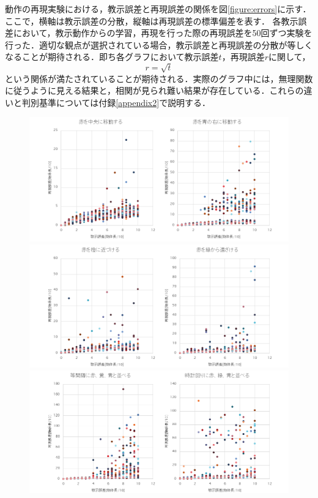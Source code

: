 動作の再現実験における，教示誤差と再現誤差の関係を図\ref{figure:errors}に示す．
ここで，横軸は教示誤差の分散，縦軸は再現誤差の標準偏差を表す．
各教示誤差において，教示動作からの学習，再現を行った際の再現誤差を50回ずつ実験を行った．適切な観点が選択されている場合，教示誤差と再現誤差の分散が等しくなることが期待される．即ち各グラフにおいて教示誤差$t$，再現誤差$r$に関して，
\[
	r = \sqrt{t}
\]
という関係が満たされていることが期待される．実際のグラフ中には，無理関数に従うように見える結果と，相関が見られ難い結果が存在している．これらの違いと判別基準については付録\ref{appendix2}で説明する．

	\begin{figure}
		\begin{center}
			\includegraphics[width=15.5cm]{chart6.png} \\ %
			\includegraphics[width=15.5cm]{chart7.png} \\ %
			\includegraphics[width=15.5cm]{chart8.png} \\ %

\end{center}
\end{figure}

